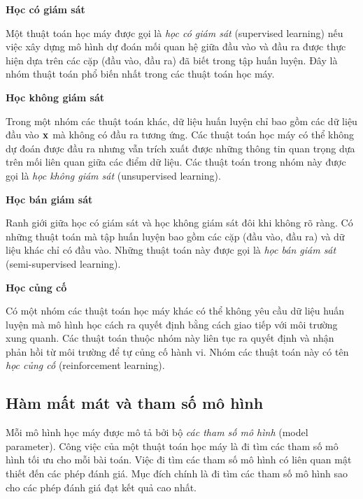 \textbf{Học có giám sát}

Một thuật toán học máy được gọi là \textit{học có giám sát} (supervised learning) nếu việc xây dựng mô hình dự đoán mối quan hệ giữa đầu vào và đầu ra được thực hiện dựa trên các cặp (đầu vào, đầu ra) đã biết trong tập huấn luyện. Đây là nhóm thuật toán phổ biến nhất trong các thuật toán học máy.

\textbf{Học không giám sát}


Trong một nhóm các thuật toán khác, dữ liệu huấn luyện chỉ bao gồm các dữ liệu đầu vào $\mathbf{x}$ mà không có đầu ra tương ứng. Các thuật toán học máy có thể không dự đoán được đầu ra nhưng vẫn trích xuất được những thông tin quan trọng dựa trên mối liên quan giữa các điểm dữ liệu. Các thuật toán trong nhóm này được gọi là \textit{học không giám sát} (unsupervised learning).


\textbf{Học bán giám sát}


Ranh giới giữa học có giám sát và học không giám sát đôi khi không rõ ràng. Có những thuật toán mà tập huấn luyện bao gồm các cặp (đầu vào, đầu ra) và dữ liệu khác chỉ có đầu vào. Những thuật toán này được gọi là \textit{học bán giám sát} (semi-supervised learning).



\textbf{Học củng cố}

Có một nhóm các thuật toán học máy khác có thể không yêu cầu dữ liệu
huấn luyện mà mô hình học cách ra quyết định bằng cách giao tiếp với môi trường
xung quanh. Các thuật toán thuộc nhóm này liên tục ra quyết định và nhận phản
hồi từ môi trường để tự củng cố hành vi. Nhóm các thuật toán này có tên
\textit{học củng cố} (reinforcement learning).

\subsection{Hàm mất mát và tham số mô hình}

Mỗi mô hình học máy được mô tả bởi bộ \textit{các tham số mô hình} (model parameter).
Công việc của một thuật toán học máy là đi tìm các tham số mô hình tối
ưu cho mỗi bài toán. Việc đi tìm các tham số mô hình có liên quan mật thiết đến
các phép đánh giá. Mục đích chính là đi tìm các tham số mô hình sao cho
các phép đánh giá đạt kết quả cao nhất.


